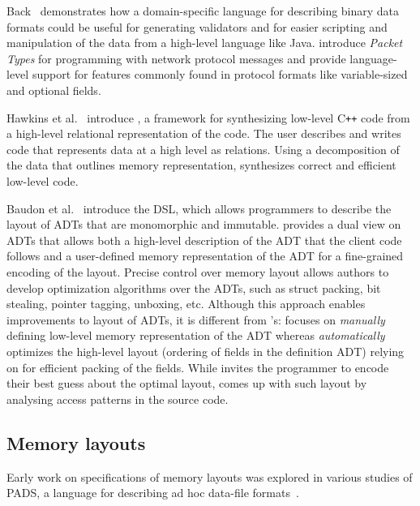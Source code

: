 Back~\cite{DataScript} demonstrates how a domain-specific language for describing binary data formats could be useful for generating validators and for easier scripting and manipulation of the data from a high-level language like Java. \cite{PacketTypes} introduce \emph{Packet Types} for programming with network protocol messages and provide language-level support for features commonly found in protocol formats like variable-sized and optional fields.

Hawkins et al.~\cite{Hawkins} introduce \relc, a framework for synthesizing low-level C\texttt{++} code from a high-level
relational representation of the code. The user describes and writes code that represents data at a high level as relations. Using a decomposition
of the data that outlines memory representation, \relc synthesizes correct and efficient low-level code.

Baudon et al.~\cite{BitStealingMadeLegal} introduce the \ribbit DSL, which allows programmers to describe the layout of ADTs that are monomorphic and immutable.
\ribbit provides a dual view on ADTs that allows both a high-level description of the ADT that the client code follows and a user-defined memory representation of the ADT
for a fine-grained encoding of the layout. Precise control over memory layout allows \ribbit authors to develop optimization algorithms over the ADTs, such as struct packing, bit stealing, pointer tagging, unboxing, etc.
Although this approach enables improvements to layout of ADTs, it is different from \system's: \ribbit focuses on \emph{manually} defining low-level memory representation of the ADT whereas \system \emph{automatically} optimizes the high-level layout (ordering of fields in the definition ADT) relying on \gibbon for efficient packing of the fields.
While \ribbit invites the programmer to encode their best guess about the optimal layout, \system comes up with such layout by analysing access patterns in the source code.

\subsection{Memory layouts}


Early work on specifications of memory layouts was explored in various studies of PADS, a language for describing ad hoc data-file formats~\cite{PADS, Pads2, Pads3}.

